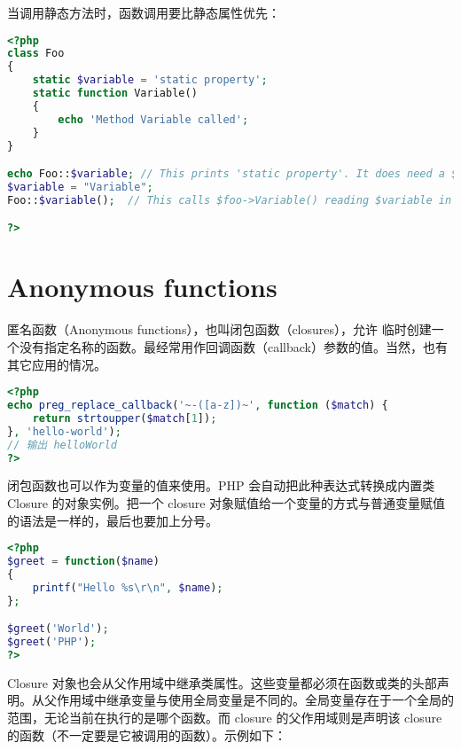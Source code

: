 当调用静态方法时，函数调用要比静态属性优先：

\begin{lstlisting}[language=PHP]
<?php
class Foo
{
    static $variable = 'static property';
    static function Variable()
    {
        echo 'Method Variable called';
    }
}

echo Foo::$variable; // This prints 'static property'. It does need a $variable in this scope.
$variable = "Variable";
Foo::$variable();  // This calls $foo->Variable() reading $variable in this scope.

?>
\end{lstlisting}


\chapter{Anonymous functions}

匿名函数（Anonymous functions），也叫闭包函数（closures），允许 临时创建一个没有指定名称的函数。最经常用作回调函数（callback）参数的值。当然，也有其它应用的情况。


\begin{lstlisting}[language=PHP]
<?php
echo preg_replace_callback('~-([a-z])~', function ($match) {
    return strtoupper($match[1]);
}, 'hello-world');
// 输出 helloWorld
?>
\end{lstlisting}

闭包函数也可以作为变量的值来使用。PHP 会自动把此种表达式转换成内置类 Closure 的对象实例。把一个 closure 对象赋值给一个变量的方式与普通变量赋值的语法是一样的，最后也要加上分号。

\begin{lstlisting}[language=PHP]
<?php
$greet = function($name)
{
    printf("Hello %s\r\n", $name);
};

$greet('World');
$greet('PHP');
?>
\end{lstlisting}

Closure 对象也会从父作用域中继承类属性。这些变量都必须在函数或类的头部声明。从父作用域中继承变量与使用全局变量是不同的。全局变量存在于一个全局的范围，无论当前在执行的是哪个函数。而 closure 的父作用域则是声明该 closure 的函数（不一定要是它被调用的函数）。示例如下：

